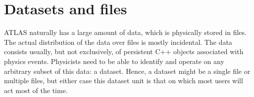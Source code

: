 \documentclass{atlasnote}
\begin{document}
{\hfill{}\hfill}

\newpage

\section{Datasets and files}
\label{overview_Dataset::doc}\label{overview_Dataset:dataset}
ATLAS naturally has a large amount of data, which is physically stored
in files. The actual distribution of the data over files is mostly
incidental. The data consists usually, but not exclusively, of
persistent C++ objects associated with physics events.  Physicists
need to be able to identify and operate on any arbitrary subset of
this data: a dataset.  Hence, a dataset might be a single file or
multiple files, but either case this dataset unit is that on
which most users will act most of the time.
\end{document}

